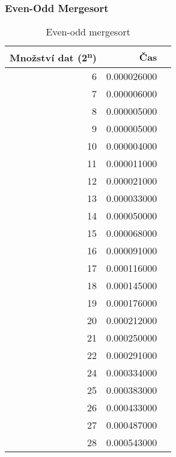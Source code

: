 \documentclass[12pt]{article}
\begin{document}
\subsubsection{Even-Odd Mergesort}
\begin{table}[H]
\begin{center}
\begin{tabular}{|r|r|r|}
\hline Množství dat (2\textsuperscript{n}) & Čas \\ \hline
6  &   0.000026000 \\ \hline
7  &   0.000006000 \\ \hline
8  &   0.000005000 \\ \hline
9  &   0.000005000 \\ \hline
10 &   0.000004000 \\ \hline
11 &   0.000011000 \\ \hline
12 &   0.000021000 \\ \hline
13 &   0.000033000 \\ \hline
14 &   0.000050000 \\ \hline
15 &   0.000068000 \\ \hline
16 &   0.000091000 \\ \hline
17 &   0.000116000 \\ \hline
18 &   0.000145000 \\ \hline
19 &   0.000176000 \\ \hline
20 &   0.000212000 \\ \hline
21 &   0.000250000 \\ \hline
22 &   0.000291000 \\ \hline
24 &   0.000334000 \\ \hline
25 &   0.000383000 \\ \hline
26 &   0.000433000 \\ \hline
27 &   0.000487000 \\ \hline
28 &   0.000543000 \\ \hline
\end{tabular} 
\end{center}
\caption{Even-odd mergesort}
\end{table} 
\end{document}
